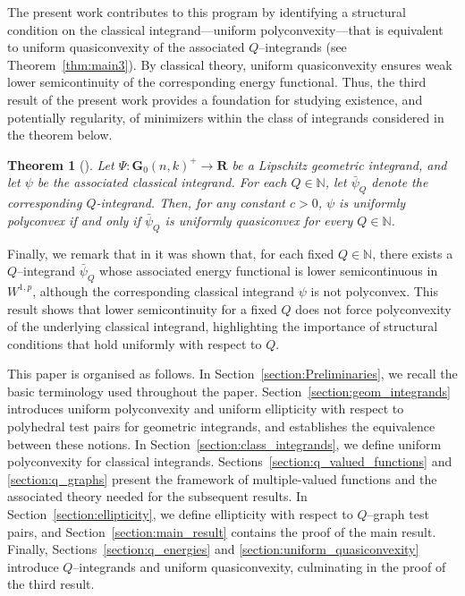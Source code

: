 \documentclass[a4paper,twoside,reqno]{article}
\theoremstyle{definition}
\theoremstyle{remark}
\theoremstyle{plain}
\newtheorem*{theorem*}{Theorem}
\theoremstyle{remark}
\theoremstyle{definition}
\newcommand{\ograss}[2]{\mathbf{G}_0(#1,#2)}
\newcommand{\natp}{\mathbb{N}}
\newcommand{\R}{\mathbf{R}}
\begin{document}
The present work contributes to this program by identifying a structural
condition on the classical integrand—uniform polyconvexity—that is equivalent to
uniform quasiconvexity of the associated $Q$--integrands (see
Theorem~\ref{thm:main3}). By classical theory, uniform quasiconvexity ensures
weak lower semicontinuity of the corresponding energy functional. Thus, the
third result of the present work provides a foundation for studying existence,
and potentially regularity, of minimizers within the class of integrands
considered in the theorem below.

\begin{theorem*}[]
    Let $\Psi : \ograss{n}{k}^{+} \to \R$ be a Lipschitz geometric integrand,
    and let $\psi$ be the associated classical integrand. For each $Q \in \natp$,
    let $\bar{\psi}_Q$ denote the corresponding $Q$-integrand. Then, for any
    constant $c>0$, $\psi$ is uniformly polyconvex if and only if $\bar{\psi}_Q$
    is uniformly quasiconvex for every $Q \in \natp$.
\end{theorem*}

Finally, we remark that in
\cite{degennaro2025nonpolyconvexqintegrandslowersemicontinuous} it was shown
that, for each fixed $Q \in \natp$, there exists a $Q$--integrand $\bar{\psi}_Q$
whose associated energy functional is lower semicontinuous in $W^{1,p}$,
although the corresponding classical integrand $\psi$ is not polyconvex. This
result shows that lower semicontinuity for a fixed $Q$ does not force
polyconvexity of the underlying classical integrand, highlighting the importance
of structural conditions that hold uniformly with respect to $Q$.

This paper is organised as follows. In Section~\ref{section:Preliminaries}, we
recall the basic terminology used throughout the
paper. Section~\ref{section:geom_integrands} introduces uniform polyconvexity
and uniform ellipticity with respect to polyhedral test pairs for geometric
integrands, and establishes the equivalence between these notions. In
Section~\ref{section:class_integrands}, we define uniform polyconvexity for
classical integrands. Sections~\ref{section:q_valued_functions} and
\ref{section:q_graphs} present the framework of multiple-valued functions and
the associated theory needed for the subsequent results. In
Section~\ref{section:ellipticity}, we define ellipticity with respect to
$Q$--graph test pairs, and Section~\ref{section:main_result} contains the proof
of the main result. Finally, Sections~\ref{section:q_energies} and
\ref{section:uniform_quasiconvexity} introduce $Q$--integrands and uniform
quasiconvexity, culminating in the proof of the third result.
\end{document}
